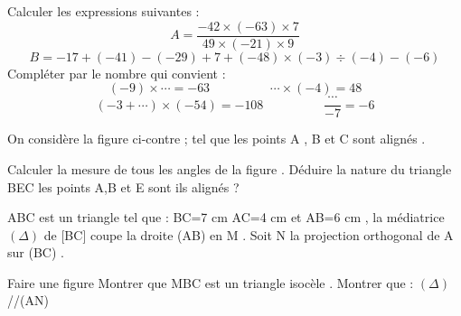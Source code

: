 \documentclass[a4paper,addpoints,12pt]{exam}
\begin{document}
\devoir[sem=1,ds=false,num=3 ,niv=1 , date=06/01/2023, Rdate=10/01/2023, prv=false]

\begin{exo}
\begin{questions}
\question Calculer les expressions suivantes :
\[A= \dfrac{-42\times (-63)\times 7}{49\times (-21)\times 9}\]
\[ B=-17+(-41)-(-29)+7+(-48)\times (-3)\div (-4)-(-6)\]
\question Compléter par le nombre qui convient :
\[ (-9)\times \cdots = -63 \hspace{2cm} \cdots \times (-4) = 48\]
\[ (-3+ \cdots )\times (-54)= -108 \hspace{2cm} \dfrac{\cdots}{-7}=-6\] 
\end{questions}
\end{exo}

\begin{exo}
\begin{minipage}{.45\linewidth}
On considère la figure ci-contre ; tel que les points A , B et C sont alignés .
\begin{questions}
\question Calculer la mesure de tous les angles de la figure .
\question Déduire la nature du triangle BEC
\question les points A,B et E sont ils alignés ?
\end{questions}
\end{minipage}
\begin{minipage}{.55\linewidth}
\end{minipage}
\end{exo}

\begin{exo}
ABC est un triangle tel que : BC=7 cm AC=4 cm et AB=6 cm , la médiatrice $(\Delta)$  de [BC] coupe la droite (AB) en M .
\newline
Soit N la projection orthogonal de A sur (BC) .
\begin{questions}
\question Faire une figure 
\question Montrer que MBC est un triangle isocèle .
\question Montrer que : $(\Delta)$ //(AN)
\end{questions}
\end{exo}
\end{document}
